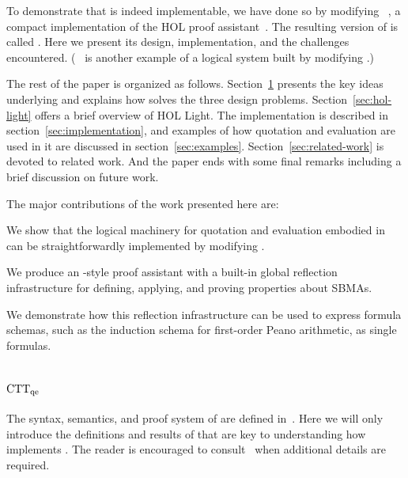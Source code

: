 \documentclass[fleqn]{llncs}
\begin{document}
To demonstrate that {\churchqe} is indeed implementable, we have done
so by modifying \HL~\cite{Harrison09}, a compact implementation of the
HOL proof assistant~\cite{GordonMelham93}.  The resulting version of
{\HL} is called \HLQE.  Here we present its design, implementation,
and the challenges encountered.  ({\HOLtwoP}~\cite{Voelker07} is another
example of a logical system built by modifying {\HL}.)

The rest of the paper is organized as follows.
Section~\ref{sec:ctt-qe} presents the key ideas underlying {\churchqe}
and explains how {\churchqe} solves the three design problems.
Section~\ref{sec:hol-light} offers a brief overview of HOL
Light.  The \HLQE{} implementation is described in
section~\ref{sec:implementation}, and examples of how quotation and
evaluation are used in it are discussed in section~\ref{sec:examples}.
Section~\ref{sec:related-work} is devoted to related work.  And the
paper ends with some final remarks including a brief discussion on future work.

The major contributions of the work presented here are:

\be

  \item We show that the logical machinery for quotation and
    evaluation embodied in {\churchqe} can be straightforwardly
    implemented by modifying {\HL}.

  \item We produce an {\HOL}-style proof assistant with a built-in
    global reflection infrastructure for defining, applying, and
    proving properties about SBMAs.

  \item We demonstrate how this reflection infrastructure can be used
    to express formula schemas, such as the induction schema for
    first-order Peano arithmetic, as single formulas.

\ee

\section{${\rm CTT_{qe}}$}\label{sec:ctt-qe}

The syntax, semantics, and proof system of {\churchqe}
are defined in~\cite{Farmer18}.  Here
we will only introduce the definitions and results of that
are key to understanding how \HLQE{} implements {\churchqe}.  The
reader is encouraged to consult~\cite{Farmer18} when additional
details are required.
\end{document}
